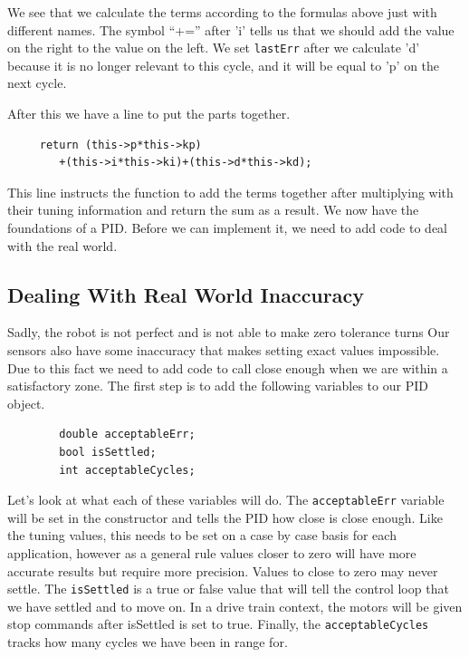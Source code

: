 \documentclass[12pt]{report}
\begin{document}
    We see that we calculate the terms according to the formulas above just with different names.
    The symbol ``+='' after 'i' tells us that we should add the value on the right to the value on the left.
    We set \verb|lastErr| after we calculate 'd' because it is no longer relevant to this cycle, and it will be equal to 'p' on the next cycle.

    After this we have a line to put the parts together.
    \begin{verbatim}
     return (this->p*this->kp)
        +(this->i*this->ki)+(this->d*this->kd);
    \end{verbatim}

    This line instructs the function to add the terms together after multiplying with their tuning information and return the sum as a result.
    We now have the foundations of a PID.
    Before we can implement it, we need to add code to deal with the real world.

\subsection{Dealing With Real World Inaccuracy}
    Sadly, the robot is not perfect and is not able to make zero tolerance turns
    Our sensors also have some inaccuracy that makes setting exact values impossible.
    Due to this fact we need to add code to call close enough when we are within a satisfactory zone.
    The first step is to add the following variables to our PID object.

    \begin{verbatim}
        double acceptableErr;
        bool isSettled;
        int acceptableCycles;
    \end{verbatim}

    Let's look at what each of these variables will do.
    The \verb|acceptableErr| variable will be set in the constructor and tells the PID how close is close enough.
    Like the tuning values, this needs to be set on a case by case basis for each application, 
        however as a general rule values closer to zero will have more accurate results but require more precision.
    Values to close to zero may never settle. The \verb|isSettled| is a true or false value that will tell the control loop that we have settled and to move on.
    In a drive train context, the motors will be given stop commands after isSettled is set to true.
    Finally, the \verb|acceptableCycles| tracks how many cycles we have been in range for.
\end{document}
